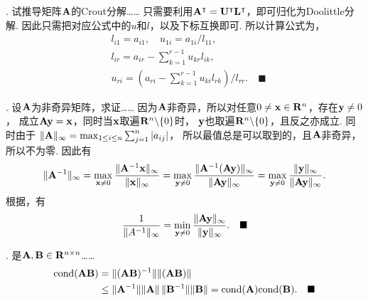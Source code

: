 \vspace{1cm}
\par{}. 试推导矩阵$\mathbf{A}$的Crout分解……
\ans
  只需要利用$\mathbf{A}^\intercal = \mathbf{U}^\intercal\mathbf{L}^\intercal$，即可归化为Doolittle分解.
  因此只需把对应公式中的$u$和$l$，以及下标互换即可. 所以计算公式为，
  \[\begin{split}
    & l_{i1} = a_{i1},\quad u_{1i} = a_{1i} / l_{11},\\
    & l_{ir} = a_{ir} - \sum_{k=1}^{r-1} u_{kr}l_{ik}, \\
    & u_{ri} = \left( a_{ri} - \sum_{k=1}^{r-1}u_{ki}l_{rk} \right) / l_{rr}.
    \quad\blacksquare
  \end{split}\]

\vspace{1cm}
\par{}. 设$\mathbf{A}$为非奇异矩阵，求证……
\proof
  因为$\mathbf{A}$非奇异，所以对任意$0\ne\mathbf{x}\in\mathbf{R}^n$，存在$\mathbf{y}\ne 0$，
  成立$\mathbf{A}\mathbf{y} = \mathbf{x}$，同时当$\mathbf{x}$取遍$\mathbf{R}^{n}\backslash\{0\}$时，
  $\mathbf{y}$也取遍$\mathbf{R}^{n}\backslash\{0\}$，且反之亦成立. 同时由于
  $\|\mathbf{A}\|_{\infty} = \max_{1\le i\le n}\sum_{j=1}^n|a_{ij}|$，
  所以最值总是可以取到的，且$\mathbf{A}$非奇异，所以不为零. 因此有
  \begin{equation}
    \label{equ1}
    \|\mathbf{A}^{-1}\|_\infty = \max_{\mathbf{x}\ne 0}\frac{\|\mathbf{A}^{-1}\mathbf{x}\|_\infty}{\|\mathbf{x}\|_\infty}
     = \max_{\mathbf{y}\ne 0}\frac{\|\mathbf{A}^{-1}(\mathbf{A}\mathbf{y})\|_\infty}{\|\mathbf{A}\mathbf{y}\|_\infty}
     = \max_{\mathbf{y}\ne 0}\frac{\|\mathbf{y}\|_\infty}{\|\mathbf{A}\mathbf{y}\|_\infty}.
  \end{equation}
  根据，有
  \[
    \frac{1}{\|A^{-1}\|_{\infty}}
    = \min_{\mathbf{y}\ne 0}\frac{\|\mathbf{A}\mathbf{y}\|_{\infty}}{\|\mathbf{y}\|_{\infty}}.
    \quad\blacksquare
  \]

\vspace{1cm}
\par{}. 是$\mathbf{A},\mathbf{B}\in\mathbf{R}^{n\times n}$……
\proof
  \[\begin{split}
    \text{cond}(\mathbf{A}\mathbf{B}) &= \|(\mathbf{A}\mathbf{B})^{-1}\|\|(\mathbf{A}\mathbf{B})\| \\
    &\le \|\mathbf{A}^{-1}\|\|\mathbf{A}\|\,\|\mathbf{B}^{-1}\|\|\mathbf{B}\|
    = \text{cond}(\mathbf{A})\text{cond}(\mathbf{B}).
    \quad\blacksquare
  \end{split}\]



